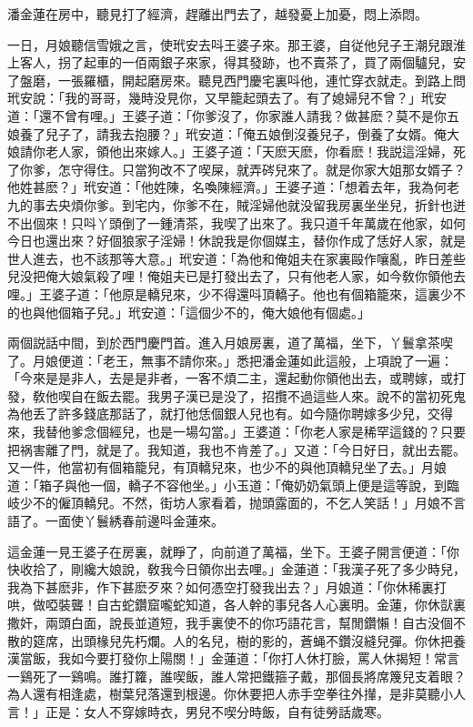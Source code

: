 潘金蓮在房中，聽見打了經濟，趕離出門去了，越發憂上加憂，悶上添悶。

一日，月娘聽信雪娥之言，使玳安去呌王婆子來。那王婆，自従他兒子王潮兒跟淮上客人，拐了起車的一佰兩銀子來家，得其發跡，也不賣茶了，買了兩個驢兒，安了盤磨，一張羅櫃，開起磨房來。聽見西門慶宅裏呌他，連忙穿衣就走。到路上問玳安說：「我的哥哥，幾時没見你，又早籠起頭去了。有了媳婦兒不曾？」玳安道：「還不曾有哩。」王婆子道：「你爹沒了，你家誰人請我？做甚麽？莫不是你五娘養了兒子了，請我去抱腰？」玳安道：「俺五娘倒沒養兒子，倒養了女婿。俺大娘請你老人家，領他出來嫁人。」王婆子道：「天麽天麽，你看麽！我説這淫婦，死了你爹，怎守得住。只當狗改不了喫屎，就弄硶兒來了。就是你家大姐那女婿子？他姓甚麽？」玳安道：「他姓陳，名喚陳經濟。」王婆子道：「想着去年，我為何老九的事去央煩你爹。到宅内，你爹不在，賊淫婦他就没留我房裏坐坐兒，折針也迸不出個來！只呌丫頭倒了一鍾清茶，我喫了出來了。我只道千年萬歲在他家，如何今日也還出來？好個狼家子淫婦！休說我是你個媒主，替你作成了恁好人家，就是世人進去，也不該那等大意。」玳安道：「為他和俺姐夫在家裏毆作嚷亂，昨日差些兒没把俺大娘氣殺了哩！俺姐夫已是打發出去了，只有他老人家，如今敎你領他去哩。」王婆子道：「他原是轎兒來，少不得還呌頂轎子。他也有個箱籠來，這裏少不的也與他個箱子兒。」玳安道：「這個少不的，俺大娘他有個處。」

兩個説話中間，到於西門慶門首。進入月娘房裏，道了萬福，坐下，丫鬟拿茶喫了。月娘便道：「老王，無事不請你來。」悉把潘金蓮如此這般，上項說了一遍：「今來是是非人，去是是非者，一客不煩二主，還起動你領他出去，或聘嫁，或打發，敎他喫自在飯去罷。我男子漢已是没了，招攬不過這些人來。說不的當初死鬼為他丢了許多錢底那話了，就打他恁個銀人兒也有。如今隨你聘嫁多少兒，交得來，我替他爹念個經兒，也是一場勾當。」王婆道：「你老人家是稀罕這錢的？只要把祸害離了門，就是了。我知道，我也不肯差了。」又道：「今日好日，就出去罷。又一件，他當初有個箱籠兒，有頂轎兒來，也少不的與他頂轎兒坐了去。」月娘道：「箱子與他一個，轎子不容他坐。」小玉道：「俺奶奶氣頭上便是這等說，到臨岐少不的僱頂轎兒。不然，街坊人家看着，抛頭露面的，不乞人笑話！」月娘不言語了。一面使丫鬟綉春前邊呌金蓮來。

這金蓮一見王婆子在房裏，就睜了，向前道了萬福，坐下。王婆子開言便道：「你快收拾了，剛纔大娘說，敎我今日領你出去哩。」金蓮道：「我漢子死了多少時兒，我為下甚麽非，作下甚麽歹來？如何憑空打發我出去？」月娘道：「你休稀裏打哄，做啞裝聾！自古蛇鑽窟嚨蛇知道，各人幹的事兒各人心裏明。金蓮，你休獃裏撒奸，兩頭白面，說長並道短，我手裏使不的你巧語花言，幫閒鑽懶！自古没個不散的筵席，出頭椽兒先朽爛。人的名兒，樹的影的，蒼蝇不鑽沒縫兒彈。你休把養漢當飯，我如今要打發你上陽關！」金蓮道：「你打人休打臉，罵人休揭短！常言一鷄死了一鷄鳴。誰打籮，誰喫飯，誰人常把鐵箍子戴，那個長將席篾兒支着眼？為人還有相逢處，樹葉兒落還到根邊。你休要把人赤手空拳往外攆，是非莫聽小人言！」正是：女人不穿嫁時衣，男兒不喫分時飯，自有徒勞話歲寒。

